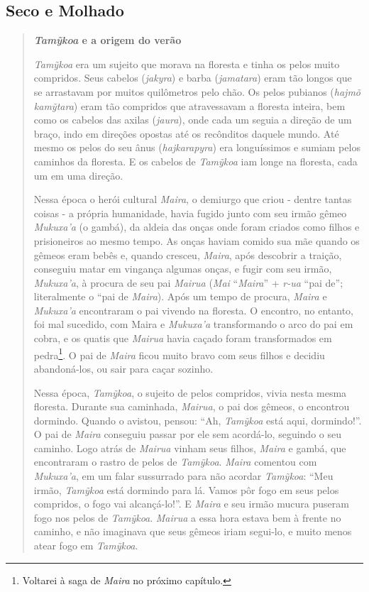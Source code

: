 \hypertarget{seco-e-molhado}{%
\subsection{Seco e Molhado}\label{seco-e-molhado}}

\begin{quote}
\textbf{\emph{Tamỹkoa} e a origem do verão}

\emph{Tamỹkoa} era um sujeito que morava na floresta e tinha os pelos
muito compridos. Seus cabelos (\emph{jakyra}) e barba (\emph{jamatara})
eram tão longos que se arrastavam por muitos quilômetros pelo chão. Os
pelos pubianos (\emph{hajmõ} \emph{kamỹtara}) eram tão compridos que
atravessavam a floresta inteira, bem como os cabelos das axilas
(\emph{jaura}), onde cada um seguia a direção de um braço, indo em
direções opostas até os recônditos daquele mundo. Até mesmo os pelos do
seu ânus (\emph{hajkarapyra}) era longuíssimos e sumiam pelos caminhos
da floresta. E os cabelos de \emph{Tamỹkoa} iam longe na floresta, cada
um em uma direção.

Nessa época o herói cultural \emph{Maira}, o demiurgo que criou - dentre
tantas coisas - a própria humanidade, havia fugido junto com seu irmão
gêmeo \emph{Mukuxa'a} (o gambá), da aldeia das onças onde foram criados
como filhos e prisioneiros ao mesmo tempo. As onças haviam comido sua
mãe quando os gêmeos eram bebês e, quando cresceu, \emph{Maira}, após
descobrir a traição, conseguiu matar em vingança algumas onças, e fugir
com seu irmão, \emph{Mukuxa'a}, à procura de seu pai \emph{Mairua}
(\emph{Mai} ``\emph{Maira}'' + \emph{r-ua} ``pai de''; literalmente o
``pai de \emph{Maira}). Após um tempo de procura, \emph{Maira} e
\emph{Mukuxa'a} encontraram o pai vivendo na floresta. O encontro, no
entanto, foi mal sucedido, com Maira e \emph{Mukuxa'a} transformando o
arco do pai em cobra, e os quatis que \emph{Mairua} havia caçado foram
transformados em pedra\footnote{Voltarei à saga de \emph{Maira} no
  próximo capítulo.}. O pai de \emph{Maira} ficou muito bravo com seus
filhos e decidiu abandoná-los, ou sair para caçar sozinho.

Nessa época, \emph{Tamỹkoa}, o sujeito de pelos compridos, vivia nesta
mesma floresta. Durante sua caminhada, \emph{Mairua}, o pai dos gêmeos,
o encontrou dormindo. Quando o avistou, pensou: ``Ah, \emph{Tamỹkoa}
está aqui, dormindo!''. O pai de \emph{Maira} conseguiu passar por ele
sem acordá-lo, seguindo o seu caminho. Logo atrás de \emph{Mairua}
vinham seus filhos, \emph{Maira} e gambá, que encontraram o rastro de
pelos de \emph{Tamỹkoa}. \emph{Maira} comentou com \emph{Mukuxa'a}, em
um falar sussurrado para não acordar \emph{Tamỹkoa}: ``Meu irmão,
\emph{Tamỹkoa} está dormindo para lá. Vamos pôr fogo em seus pelos
compridos, o fogo vai alcançá-lo!''. E \emph{Maira} e seu irmão mucura
puseram fogo nos pelos de \emph{Tamỹkoa}. \emph{Mairua} a essa hora
estava bem à frente no caminho, e não imaginava que seus gêmeos iriam
segui-lo, e muito menos atear fogo em \emph{Tamỹkoa}.


\end{quote}
